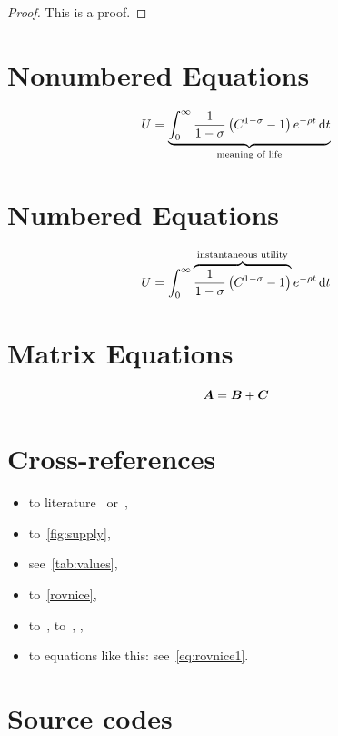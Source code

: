 \begin{proof}
This is a proof.
\end{proof}

\section{Nonumbered Equations}


    \[ U = \underbrace{\int_0^{\infty} \frac{1}{1-\sigma}\left(C^{1-\sigma} -1 \right) e^{-\rho t} \,\mathrm{d} t}_\text{meaning of life} \]


\section{Numbered Equations}

\begin{equation}\label{eq:rovnice1}
    U = \int_0^{\infty} \overbrace{ \frac{1}{1-\sigma}\left(C^{1-\sigma} -1 \right)}^\text{instantaneous utility} e^{-\rho t} \,\mathrm{d} t
\end{equation}

\section{Matrix Equations}

\begin{equation}\label{eq:rovnice2}
    \mbox{\boldmath $A$} = \mbox{\boldmath $B$} + \mbox{\boldmath $C$}
\end{equation}

\section{Cross-references}

\begin{itemize}
    \item to literature~\citep[pg.~10]{Bjorvatn2006} 	
            or~\citet[pg.~10]{Haufler2006},
    \item to~\autoref{fig:supply},														%
    \item see~\autoref{tab:values},
    \item to~\autoref{rovnice},
    \item to~, to~,
            , 
    \item to equations like this: see~\eqref{eq:rovnice1}.
\end{itemize}

\section{Source codes}

